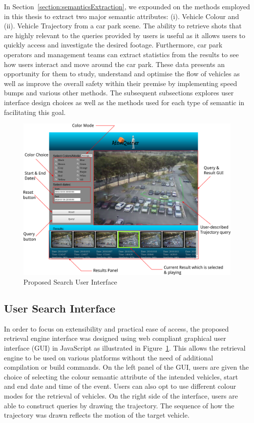 In Section~\ref{section:semanticsExtraction}, 
we expounded on the methods employed in this thesis to extract two major semantic attributes: 
(i). Vehicle Colour and (ii). Vehicle Trajectory from a car park scene. 
The ability to retrieve shots that are highly relevant to the queries provided by users is useful as it allows users to quickly access and investigate the desired footage. 
Furthermore, car park operators and management teams can extract statistics from the results to see how users interact and move around the car park. 
These data presents an opportunity for them to study, understand and optimise the flow of vehicles as well as improve the overall safety within their premise by implementing speed bumps and various other methods.
The subsequent subsections explores user interface design choices as well as the methods used for each type of semantic in facilitating this goal.

\begin{figure}[thb!]\centering
\includegraphics[width=\textwidth]{image/retrievalTwo/VISERinterface2.png}
\caption{Proposed Search User Interface}
\label{fig:versionTwoInterface}
\end{figure}

\subsection{User Search Interface}
In order to focus on extensibility and practical ease of access, the proposed retrieval engine interface was designed using web compliant graphical user interface (GUI) in JavaScript as illustrated in Figure~\ref{fig:versionTwoInterface}. 
This allows the retrieval engine to be used on various platforms without the need of additional compilation or build commands.
On the left panel of the GUI, users are given the choice of selecting the colour semantic attribute of the intended vehicles, start and end date and time of the event. Users can also opt to use different colour modes for the retrieval of vehicles. 
On the right side of the interface, users are able to construct queries by drawing the trajectory. 
The sequence of how the trajectory was drawn reflects the motion of the target vehicle.

